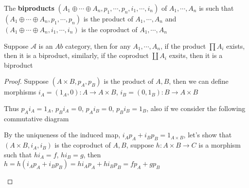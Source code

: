 \documentclass[../main.tex]{subfiles}
\begin{document}
\begin{definition}
The \textbf{biproducts} $(A_1\oplus\cdots\oplus A_n,p_1,\cdots,p_n,i_1,\cdots,i_n)$ of $A_1,\cdots,A_n$ is such that $(A_1\oplus\cdots\oplus A_n,p_1,\cdots,p_n)$ is the product of $A_1,\cdots,A_n$ and $(A_1\oplus\cdots\oplus A_n,i_1,\cdots,i_n)$ is the coproduct of $A_1,\cdots,A_n$
\end{definition}

\begin{lemma}
Suppose $\mathscr A$ is an $Ab$ category, then for any $A_1,\cdots,A_n$, if the product $\prod A_i$ exists, then it is a biproduct, similarly, if the coproduct $\coprod A_i$ exsits, then it is a biproduct
\end{lemma}

\begin{proof}
Suppose $(A\times B,p_A,p_B)$ is the product of $A,B$, then we can define morphisms $i_A=(1_A,0):A\to A\times B$, $i_B=(0,1_B):B\to A\times B$
\begin{center}
\end{center}
Thus $p_Ai_A=1_A$, $p_Bi_A=0$, $p_Ai_B=0$, $p_Bi_B=1_B$, also if we consider the following commutative diagram
\begin{center}
\end{center}
By the uniqueness of the induced map, $i_Ap_A+i_Bp_B=1_{A\times B}$, let's show that $(A\times B,i_A,i_B)$ is the coproduct of $A,B$, suppose $h:A\times B\to C$ is a morphism such that $hi_A=f$, $hi_B=g$, then $h=h(i_Ap_A+i_Bp_B)=hi_Ap_A+hi_Bp_B=fp_A+gp_B$
\begin{center}
\end{center}
\end{proof}
\end{document}
